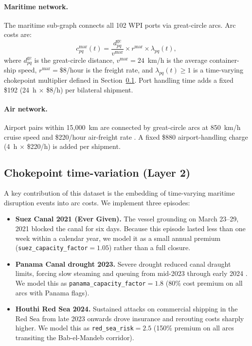 \documentclass[11pt, a4paper]{article}
\begin{document}
\paragraph{Maritime network.}
The maritime sub-graph connects all 102 WPI ports via great-circle arcs.
Arc costs are:
\begin{equation}
  c^{\text{mar}}_{pq}(t) = \frac{d^{\text{gc}}_{pq}}{v^{\text{mar}}}
  \times r^{\text{mar}} \times \lambda_{pq}(t),
\label{eq:maritime_cost}
\end{equation}
where $d^{\text{gc}}_{pq}$ is the great-circle distance, $v^{\text{mar}} =
24$~km/h is the average container-ship speed, $r^{\text{mar}} = \$8$/hour is
the freight rate, and $\lambda_{pq}(t) \geq 1$ is a time-varying chokepoint
multiplier defined in Section~\ref{sec:construction:chokepoint}.  Port
handling time adds a fixed \$192 (24~h $\times$ \$8/h) per bilateral
shipment.

\paragraph{Air network.}
Airport pairs within 15{,}000~km are connected by great-circle arcs at
850~km/h cruise speed and \$220/hour air-freight rate \citep{hummels_2007}.
A fixed \$880 airport-handling charge (4~h $\times$ \$220/h) is added per
shipment.

\subsection{Chokepoint time-variation (Layer 2)}
\label{sec:construction:chokepoint}

A key contribution of this dataset is the embedding of time-varying maritime
disruption events into arc costs.  We implement three episodes:

\begin{itemize}
\item \textbf{Suez Canal 2021 (Ever Given).}  The vessel grounding on March
  23--29, 2021 blocked the canal for six days.  Because this episode lasted
  less than one week within a calendar year, we model it as a small annual
  premium (\texttt{suez\_capacity\_factor}$= 1.05$) rather than a full
  closure.

\item \textbf{Panama Canal drought 2023.}  Severe drought reduced canal
  draught limits, forcing slow steaming and queuing from mid-2023 through
  early 2024 \citep{espitia_rocha_ruta_2022}.  We model this as
  \texttt{panama\_capacity\_factor}$= 1.8$ (80\% cost premium on all arcs
  with Panama flags).

\item \textbf{Houthi Red Sea 2024.}  Sustained attacks on commercial
  shipping in the Red Sea from late 2023 onwards drove insurance and
  rerouting costs sharply higher.  We model this as
  \texttt{red\_sea\_risk}$= 2.5$ (150\% premium on all arcs transiting
  the Bab-el-Mandeb corridor).
\end{itemize}
\end{document}

